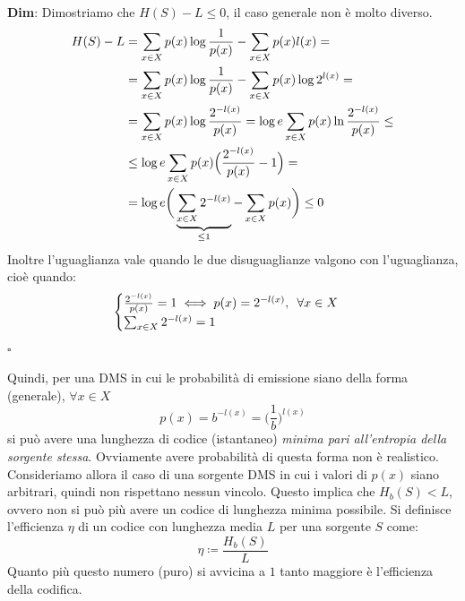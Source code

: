 \begin{tcolorbox}
\textbf{Dim}: Dimostriamo che $H(S)-L \leq 0$, il caso generale non \`e molto diverso.
\begin{align*}
    H(S) - L &= \sum_{x \in X} p(x) \log \frac{1}{p({x})} - \sum_{x \in X} p(x) l(x) = \\
    &= \sum_{x \in X} p(x) \log \frac{1}{p({x})} - \sum_{x \in X} p(x) \log 2^{l(x)} = \\
    &= \sum_{x \in X} p(x) \log \frac{2^{-l(x)}}{p(x)} = \log e \sum_{x \in X} p(x) \ln \frac{2^{-l(x)}}{p(x)} \leq \\
    &\leq \log e \sum_{x \in X} p(x) \Big ( \frac{2^{-l(x)}}{p(x)} - 1 \Big ) = \\
    &=\log e \bigg ( \underbrace{\sum_{x \in X} 2^{-l(x)}}_{\leq 1} - \sum_{x \in X} p(x) \bigg ) \leq 0
\end{align*}
Inoltre l'uguaglianza vale quando le due disuguaglianze valgono con l'uguaglianza, cio\`e quando:
\begin{equation*}
\begin{cases}
\frac{2^{-l(x)}}{p(x)} = 1 \iff p(x) = 2^{-l(x)}, \hspace{5pt} \forall x \in X \\
\sum_{x \in X} 2^{-l(x)} = 1
\end{cases}
\end{equation*}
\hspace{400pt}$\square$
\end{tcolorbox}
Quindi, per una DMS in cui le probabilità di emissione siano della forma (generale), $\forall x \in X$
\begin{equation*}
    p(x) = b^{-l(x)} =  \Big ( \frac{1}{b} \Big )^{l(x)}
\end{equation*}
si può avere una lunghezza  di  codice  (istantaneo) \textit{minima pari all’entropia della  sorgente stessa}. Ovviamente  avere probabilità di questa forma non è realistico. Consideriamo allora il caso di una sorgente DMS in cui i valori di $p(x)$ siano arbitrari, quindi non rispettano nessun vincolo. Questo implica che $H_b(S) < L$, ovvero non si può più avere un codice di lunghezza minima possibile. 
 Si definisce l'efficienza $\eta$ di un codice con lunghezza media $L$ per una sorgente $S$ come:
\begin{equation}
    \eta \coloneqq \frac{H_b(S)}{L}
\end{equation}
Quanto pi\`u questo numero (puro) si avvicina a $1$ tanto maggiore \`e l'efficienza della codifica. 
